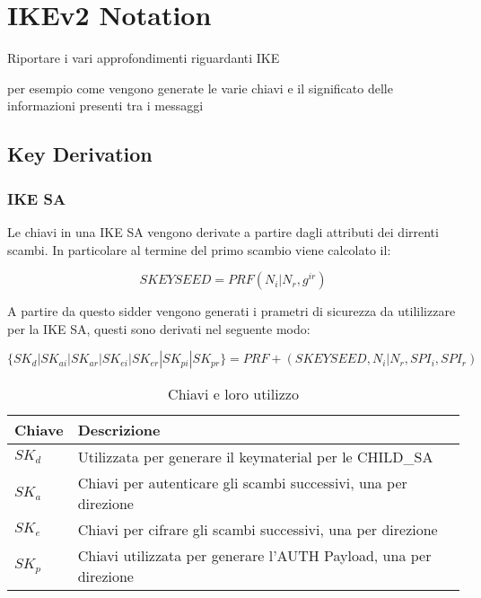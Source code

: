 
\chapter{IKEv2 Notation} %

\label{AppendixA} %

Riportare i vari approfondimenti riguardanti IKE

per esempio come vengono generate le varie chiavi e il significato delle informazioni presenti tra i messaggi


\section{Key Derivation}

\subsection{IKE SA}

Le chiavi in una IKE SA vengono derivate a partire dagli attributi dei dirrenti scambi.
In particolare al termine del primo scambio viene calcolato il:

$$SKEYSEED=PRF(N_i|N_r,g^{ir})$$

A partire da questo sidder vengono generati i prametri di sicurezza da utililizzare per la IKE SA, questi sono derivati nel seguente modo:

$$\{SK_{d} | SK_{ai} | SK_{ar} | SK_{ei} | SK_{er} | SK_{pi} | SK_{pr} \} = PRF+(SKEYSEED, N_i|N_r, SPI_i, SPI_r)$$

\begin{table}[htbp]
    \centering
    \begin{tabular}{ll}
        \toprule
        \textbf{Chiave} & \textbf{Descrizione} \\
        \midrule
        $SK_d$ & Utilizzata per generare il keymaterial per le CHILD\_SA \\
        $SK_{a}$ & Chiavi per autenticare gli scambi successivi, una per direzione \\
        $SK_{e}$ & Chiavi per cifrare gli scambi successivi, una per direzione \\
        $SK_{p}$ & Chiavi utilizzata per generare l'AUTH Payload, una per direzione \\
        \bottomrule
    \end{tabular}
    \caption{Chiavi e loro utilizzo}
\end{table}

